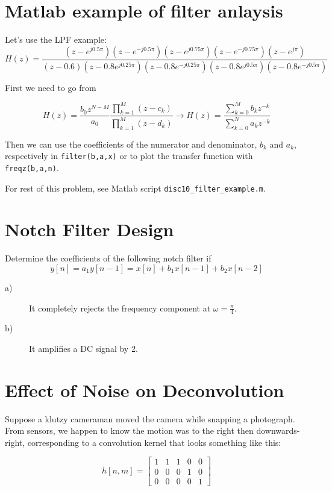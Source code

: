 \documentclass[11pt]{article}
\begin{document}
\section{Matlab example of filter anlaysis}

Let's use the LPF example:
	\[ H(z) = \frac{(z-e^{j0.5 \pi})(z-e^{-j0.5 \pi})(z-e^{j0.75 \pi})(z-e^{-j0.75 \pi})(z-e^{j \pi})}{(z-0.6)(z-0.8e^{j0.25 \pi})(z-0.8e^{-j0.25 \pi})(z-0.8e^{j0.5 \pi})(z-0.8e^{-j0.5 \pi})} \]

First we need to go from

\[
H(z) = \frac{b_0 z^{N-M}}{a_0} \frac{\prod_{k=1}^M (z-c_k)}{\prod_{k=1}^M (z-d_k)} \rightarrow H(z) = \frac{\sum_{k=0}^M b_k z^{-k}}{\sum_{k=0}^N a_k z^{-k}} 
\]

Then we can use the coefficients of the numerator and denominator, $b_k$ and $a_k$, respectively in \texttt{filter(b,a,x)} or to plot the transfer function with \texttt{freqz(b,a,n)}.

For rest of this problem, see Matlab script \texttt{disc10\_filter\_example.m}.

\section{Notch Filter Design}
Determine the coefficients of the following notch filter if 
\[ y[n] = a_1y[n-1] = x[n]+b_1x[n-1]+b_2x[n-2] \]

\begin{description}
\item[a)] It completely rejects the frequency component at $\omega = \frac{\pi}{4}$.
\item[b)] It amplifies a DC signal by 2.
\end{description}

\section{Effect of Noise on Deconvolution}

Suppose a klutzy cameraman moved the camera while snapping a photograph. From sensors, we happen to know the motion was to the right then downwards-right, corresponding to a convolution kernel that looks something like this:

\[ h[n,m] = \begin{bmatrix} 1 & 1 & 1 & 0 & 0\\
							0 & 0 & 0 & 1 & 0\\
							0 & 0 & 0 & 0 & 1 \end{bmatrix} \]
							
\end{document}
